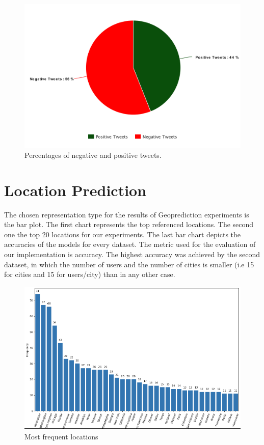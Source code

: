 \documentclass[12pt,svgnames]{report}
\begin{document}
\begin{figure}[H]
	\centering
	\includegraphics[scale=0.6]{pie_chart}
	\caption{Percentages of negative and positive tweets.}
	\label{fig:pie_chart}
\end{figure}

\section*{Location Prediction}
The chosen representation type for the results of Geoprediction experiments is the bar plot. The first chart represents the top referenced locations. The second one the top 20 locations for our experiments. The last bar chart depicts the accuracies of the models for every dataset. The metric used for the evaluation of our implementation is accuracy. The highest accuracy was achieved by the second dataset, in which the number of users and the number of cities is smaller (i.e 15 for cities and 15 for users/city) than in any other case.

\begin{figure}[H]
	\centering
	\includegraphics[scale = 0.5]{toplocations.png}
	\caption{Most frequent locations}
\end{figure}
\end{document}
